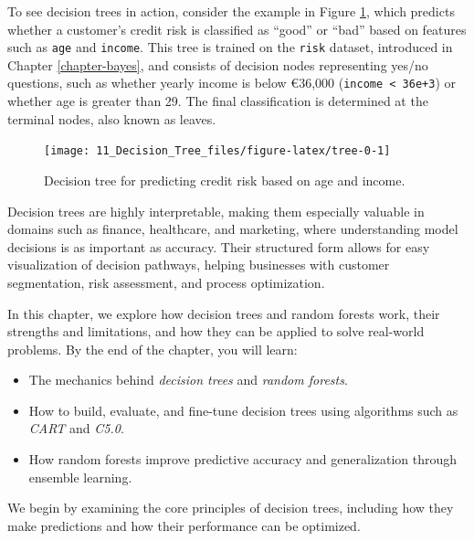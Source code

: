 \documentclass[
  11pt,
]{book}
\newcommand{\passthrough}[1]{#1}
\providecommand{\tightlist}{%
  \setlength{\itemsep}{0pt}\setlength{\parskip}{0pt}}
\theoremstyle{definition}
\theoremstyle{definition}
\theoremstyle{definition}
\theoremstyle{definition}
\theoremstyle{remark}
\begin{document}
To see decision trees in action, consider the example in Figure \ref{fig:tree-0}, which predicts whether a customer's credit risk is classified as ``good'' or ``bad'' based on features such as \passthrough{\lstinline!age!} and \passthrough{\lstinline!income!}. This tree is trained on the \passthrough{\lstinline!risk!} dataset, introduced in Chapter \ref{chapter-bayes}, and consists of decision nodes representing yes/no questions, such as whether yearly income is below €36,000 (\passthrough{\lstinline!income < 36e+3!}) or whether age is greater than 29. The final classification is determined at the terminal nodes, also known as leaves.

\begin{figure}[H]

{\centering \texttt{[image: 11\_Decision\_Tree\_files/figure-latex/tree-0-1]} 

}

\caption{Decision tree for predicting credit risk based on age and income.}\label{fig:tree-0}
\end{figure}

Decision trees are highly interpretable, making them especially valuable in domains such as finance, healthcare, and marketing, where understanding model decisions is as important as accuracy. Their structured form allows for easy visualization of decision pathways, helping businesses with customer segmentation, risk assessment, and process optimization.

In this chapter, we explore how decision trees and random forests work, their strengths and limitations, and how they can be applied to solve real-world problems. By the end of the chapter, you will learn:

\begin{itemize}
\tightlist
\item
  The mechanics behind \emph{decision trees} and \emph{random forests}.\\
\item
  How to build, evaluate, and fine-tune decision trees using algorithms such as \emph{CART} and \emph{C5.0}.\\
\item
  How random forests improve predictive accuracy and generalization through ensemble learning.
\end{itemize}

We begin by examining the core principles of decision trees, including how they make predictions and how their performance can be optimized.
\end{document}
